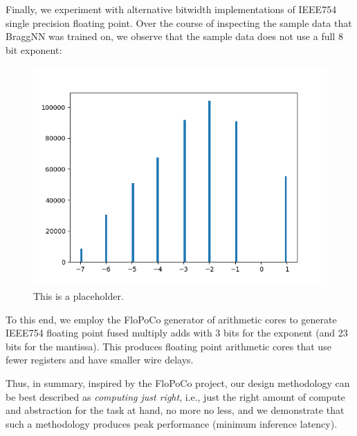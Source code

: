 Finally, we experiment with alternative bitwidth implementations of IEEE754 single precision floating point.
Over the course of inspecting the sample data that BraggNN was trained on, we observe that the sample data does not use a full 8 bit exponent:
\begin{figure}
	\includegraphics[width=\columnwidth]{figures/exp_bits}
	\caption{This is a placeholder.}
\end{figure}
To this end, we employ the FloPoCo\cite{8877424} generator of arithmetic cores to generate IEEE754 floating point fused multiply adds with 3 bits for the exponent (and 23 bits for the mantissa).
This produces floating point arithmetic cores that use fewer registers and have smaller wire delays.

Thus, in summary, inspired by the FloPoCo project, our design methodology can be best described as \emph{computing just right}, i.e., just the right amount of compute and abstraction for the task at hand, no more no less, and we demonstrate that such a methodology produces peak performance (minimum inference latency).